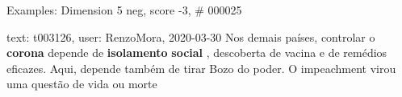 \begin{frame}{Examples: Dimension 5 neg, score -3, \# 000025}
\footnotesize
\begin{alertblock}{text: t003126, user: RenzoMora, 2020-03-30}
Nos demais países, controlar o \textbf{corona} depende de \textbf{isolamento} 
\textbf{social} , descoberta de vacina e de remédios eficazes. Aqui, depende 
também de tirar Bozo do poder. O impeachment virou uma questão de vida ou morte 
\end{alertblock}
\end{frame}
